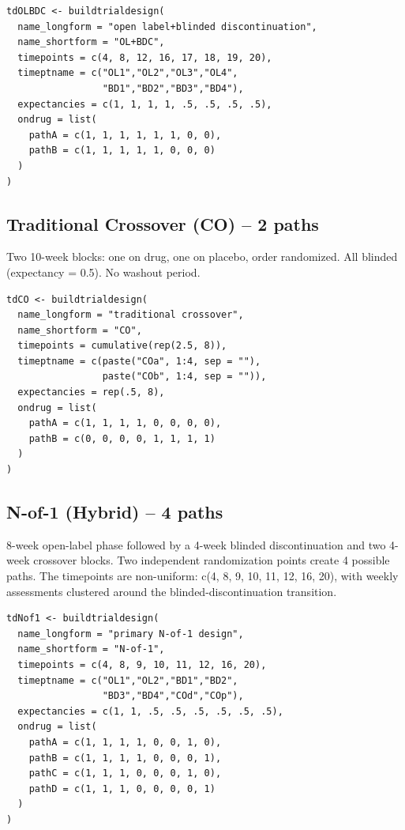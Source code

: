\documentclass[11pt]{article}
\begin{document}
\begin{lstlisting}
tdOLBDC <- buildtrialdesign(
  name_longform = "open label+blinded discontinuation",
  name_shortform = "OL+BDC",
  timepoints = c(4, 8, 12, 16, 17, 18, 19, 20),
  timeptname = c("OL1","OL2","OL3","OL4",
                 "BD1","BD2","BD3","BD4"),
  expectancies = c(1, 1, 1, 1, .5, .5, .5, .5),
  ondrug = list(
    pathA = c(1, 1, 1, 1, 1, 1, 0, 0),
    pathB = c(1, 1, 1, 1, 1, 0, 0, 0)
  )
)
\end{lstlisting}

\subsection{Traditional Crossover (CO) -- 2 paths}

Two 10-week blocks: one on drug, one on placebo, order
randomized. All blinded (expectancy = 0.5). No washout period.

\begin{lstlisting}
tdCO <- buildtrialdesign(
  name_longform = "traditional crossover",
  name_shortform = "CO",
  timepoints = cumulative(rep(2.5, 8)),
  timeptname = c(paste("COa", 1:4, sep = ""),
                 paste("COb", 1:4, sep = "")),
  expectancies = rep(.5, 8),
  ondrug = list(
    pathA = c(1, 1, 1, 1, 0, 0, 0, 0),
    pathB = c(0, 0, 0, 0, 1, 1, 1, 1)
  )
)
\end{lstlisting}

\subsection{N-of-1 (Hybrid) -- 4 paths}

8-week open-label phase followed by a 4-week blinded
discontinuation and two 4-week crossover blocks. Two independent
randomization points create 4 possible paths. The timepoints are
non-uniform: c(4, 8, 9, 10, 11, 12, 16, 20), with weekly
assessments clustered around the blinded-discontinuation
transition.

\begin{lstlisting}
tdNof1 <- buildtrialdesign(
  name_longform = "primary N-of-1 design",
  name_shortform = "N-of-1",
  timepoints = c(4, 8, 9, 10, 11, 12, 16, 20),
  timeptname = c("OL1","OL2","BD1","BD2",
                 "BD3","BD4","COd","COp"),
  expectancies = c(1, 1, .5, .5, .5, .5, .5, .5),
  ondrug = list(
    pathA = c(1, 1, 1, 1, 0, 0, 1, 0),
    pathB = c(1, 1, 1, 1, 0, 0, 0, 1),
    pathC = c(1, 1, 1, 0, 0, 0, 1, 0),
    pathD = c(1, 1, 1, 0, 0, 0, 0, 1)
  )
)
\end{lstlisting}
\end{document}
